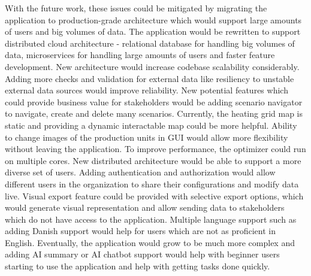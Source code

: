 With the future work, these issues could be mitigated by migrating the application to production-grade architecture which would support large amounts of users and big volumes of data. The application would be rewritten to support distributed cloud architecture - relational database for handling big volumes of data, microservices for handling large amounts of users and faster feature development. New architecture would increase codebase scalability considerably. Adding more checks and validation for external data like resiliency to unstable external data sources would improve reliability. New potential features which could provide business value for stakeholders would be adding scenario navigator to navigate, create and delete many scenarios. Currently, the heating grid map is static and providing a dynamic interactable map could be more helpful. Ability to change images of the production units in GUI would allow more flexibility without leaving the application. To improve performance, the optimizer could run on multiple cores. New distributed architecture would be able to support a more diverse set of users. Adding authentication and authorization would allow different users in the organization to share their configurations and modify data live. Visual export feature could be provided with selective export options, which would generate visual representation and allow sending data to stakeholders which do not have access to the application. Multiple language support such as adding Danish support would help for users which are not as proficient in English. Eventually, the application would grow to be much more complex and adding AI summary or AI chatbot support would help with beginner users starting to use the application and help with getting tasks done quickly.\par


